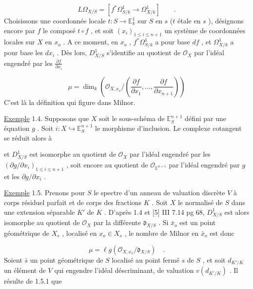 \begin{equation*}
L\Omega_{X/S} = [f^*\Omega^1_{S/k} \to \Omega^1_{X/k}] \qquad .
\end{equation*}
Choisissons une coordonnée locale $t : S \to \mathbb{E}^1_k$ sur $S$ en $s$ ($t$ étale en $s$ ), désignons encore par $f$ le composé $t \circ f$ , et soit $(x_i)_{1 \leq i \leq n+1}$ un système de coordonnées locales sur $X$ en $x_o$ . A ce moment, en $x_o$ , $f^*\Omega^1_{S/k}$ a pour base $df$ , et $\Omega^1_{X/k}$ a pour base les $dx_i$ . Dès lors, $D^1_{X/S}$ s'identifie au quotient de $\mathcal{O}_X$ par l'idéal engendré par les $\frac{\partial f}{\partial x_i}$

\begin{equation}\tag{1.3.1}
\mu = \dim_k(\mathcal{O}_{X,x_o}/(\frac{\partial f}{\partial x_1},\ldots,\frac{\partial f}{\partial x_{n+1}}))
\end{equation}
C'est là la définition qui figure dans Milnor.

\underline{Exemple} 1.4. Supposons que $X$ soit le sous-schéma de $\mathbb{E}^{n+1}_S$ défini par une équation $g$ . Soit $i : X \hookrightarrow \mathbb{E}^{n+1}_S$ le morphisme d'inclusion. Le complexe cotangent se réduit alors à

\begin{equation*}
[(g)/(g)^2 \longrightarrow i^*\Omega^1_{\mathbb{E}^{n+1}/S}]
\end{equation*}
et $D^1_{X/S}$ est isomorphe au quotient de $\mathcal{O}_X$ par l'idéal engendré par les $(\partial g/\partial x_i)_{1 \leq i \leq n+1}$ , soit encore au quotient de $\mathcal{O}_{\mathbb{E}^{n+1}}$ par l'idéal engendré par $g$ et les $\partial g/\partial x_i$ .

\underline{Exemple} 1.5. Prenons pour $S$ le spectre d'un anneau de valuation discrète $V$ à corps résiduel parfait et de corps des fractions $K$ . Soit $X$ le normalisé de $S$
dans une extension séparable $K'$ de $K$ . D'après 1.4 et [5] III 7.14 pg 68, $D^1_{X/S}$ est alors isomorphe au quotient de $\mathcal{O}_X$ par la différente $\mathfrak{d}_{X/S}$ . Si $\bar{x}_o$ est un point géométrique de $X_s$ , localisé en $x_o \in X_s$ , le nombre de Milnor en $\bar{x}_o$ est donc

\begin{equation}\tag{1.5.1}
\mu = \ell g(\mathcal{O}_{X,x_o}/\mathfrak{d}_{X/S}) \quad .
\end{equation}
Soient $\bar{s}$ un point géométrique de $S$ localisé au point fermé $s$ de $S$ , et soit $d_{K'/K}$ un élément de $V$ qui engendre l'idéal déscriminant, de valuation $v(d_{K'/K})$ . Il résulte de 1.5.1 que

